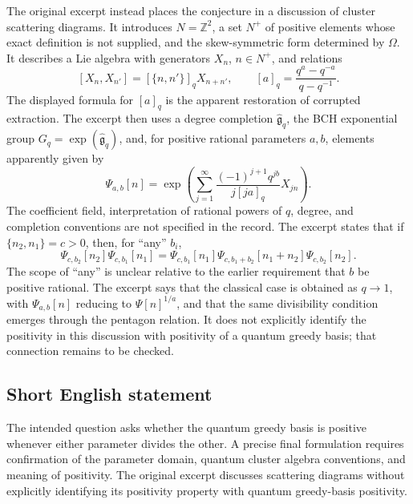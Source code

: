 \documentclass[11pt]{article}
\newcommand{\Z}{\mathbb{Z}}
\begin{document}
The original excerpt instead places the conjecture in a discussion of cluster scattering diagrams. It introduces \(N=\Z^2\), a set \(N^+\) of positive elements whose exact definition is not supplied, and the skew-symmetric form determined by \(\Omega\). It describes a Lie algebra with generators \(X_n\), \(n\in N^+\), and relations
\[
[X_n,X_{n'}]=[\{n,n'\}]_qX_{n+n'},
\qquad [a]_q=\frac{q^a-q^{-a}}{q-q^{-1}}.
\]
The displayed formula for \([a]_q\) is the apparent restoration of corrupted extraction. The excerpt then uses a degree completion \(\widehat{\mathfrak g}_q\), the BCH exponential group \(G_q=\exp(\widehat{\mathfrak g}_q)\), and, for positive rational parameters \(a,b\), elements apparently given by
\[
\Psi_{a,b}[n]=\exp\!\left(\sum_{j=1}^{\infty}
\frac{(-1)^{j+1}q^{jb}}{j[ja]_q}X_{jn}\right).
\]
The coefficient field, interpretation of rational powers of \(q\), degree, and completion conventions are not specified in the record. The excerpt states that if \(\{n_2,n_1\}=c>0\), then, for ``any'' \(b_i\),
\[
\Psi_{c,b_2}[n_2]\Psi_{c,b_1}[n_1]
=
\Psi_{c,b_1}[n_1]\Psi_{c,b_1+b_2}[n_1+n_2]\Psi_{c,b_2}[n_2].
\]
The scope of ``any'' is unclear relative to the earlier requirement that \(b\) be positive rational. The excerpt says that the classical case is obtained as \(q\to1\), with \(\Psi_{a,b}[n]\) reducing to \(\Psi[n]^{1/a}\), and that the same divisibility condition emerges through the pentagon relation. It does not explicitly identify the positivity in this discussion with positivity of a quantum greedy basis; that connection remains to be checked.
\subsection{Short English statement}
The intended question asks whether the quantum greedy basis is positive whenever either parameter divides the other. A precise final formulation requires confirmation of the parameter domain, quantum cluster algebra conventions, and meaning of positivity. The original excerpt discusses scattering diagrams without explicitly identifying its positivity property with quantum greedy-basis positivity.
\end{document}
